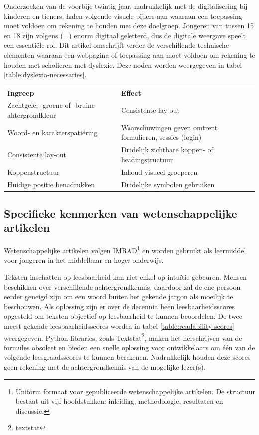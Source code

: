 \medspace

Onderzoeken van de voorbije twintig jaar, nadrukkelijk met de digitalisering bij kinderen en tieners, halen volgende visuele pijlers aan waaraan een toepassing moet voldoen om rekening te houden met deze doelgroep. Jongeren van tussen 15 en 18 zijn volgens (...) enorm digitaal geletterd, dus de digitale weergave speelt een essentiële rol. Dit artikel omschrijft verder de verschillende technische elementen waaraan een webpagina of toepassing aan moet voldoen om rekening te houden met scholieren met dyslexie. Deze noden worden weergegeven in tabel \ref{table:dyslexia-necessaries}. %

\begin{center}
	\begin{tabular}{ | m{8cm} | m{8cm} | } 
		\hline
		\textbf{Ingreep} & \textbf{Effect} \\ 
		Zachtgele, -groene of -bruine ahtergrondkleur & Consistente lay-out \\
		\hline
		Woord- en karakterspatiëring & Waarschuwingen geven omtrent formulieren, sessies (login) \\ 
		\hline
		Consistente lay-out & Duidelijk zichtbare koppen- of headingstructuur \\ 
		\hline
		Koppenstructuur &  Inhoud visueel groeperen \\
		\hline
		Huidige positie benadrukken & Duidelijke symbolen gebruiken \\
		\hline
	\end{tabular}
	\label{table:dyslexia-necessaries}
\end{center}

\subsection{Specifieke kenmerken van wetenschappelijke artikelen}

Wetenschappelijke artikelen volgen IMRAD\footnote{Uniform formaat voor gepubliceerde wetenschappelijke artikelen. De structuur bestaat uit vijf hoofdstukken: inleiding, methodologie, resultaten en discussie.} en worden gebruikt als leermiddel voor jongeren in het middelbaar en hoger onderwijs. 

\medspace

Teksten inschatten op leesbaarheid kan niet enkel op intuïtie gebeuren. Mensen beschikken over verschillende achtergrondkennis, daardoor zal de ene persoon eerder geneigd zijn om een woord buiten het gekende jargon als moeilijk te beschouwen. Als oplossing zijn er over de decennia heen leesbaarheidsscores opgesteld om teksten objectief op leesbaarheid te kunnen beoordelen. De twee meest gekende leesbaarheidsscores worden in tabel \ref{table:readability-scores} weergegeven. Python-libraries, zoals Textstat\footnote{textstat}, maken het herschrijven van de formules obsoleet en bieden een snelle oplossing voor ontwikkelaars om één van de volgende leesgraadsscores te kunnen berekenen. Nadrukkelijk houden deze scores geen rekening met de achtergrondkennis van de mogelijke lezer(s).

